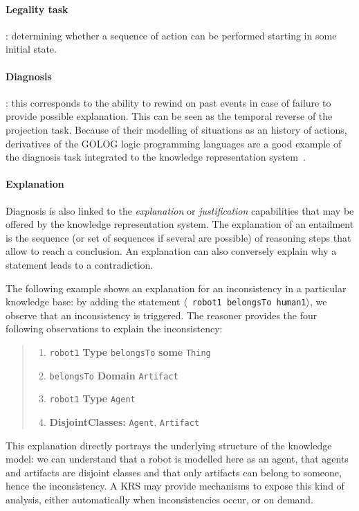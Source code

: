 \documentclass[a4paper, twocolumn]{article}
\newcommand{\concept}[1]{{\footnotesize \texttt{#1}}}
\newcommand{\stmt}[1]{{\footnotesize \tt $\langle$ #1\relax$\rangle$}}
\begin{document}
\paragraph{Legality task}: determining whether a sequence of action can be
performed starting in some initial state.

\paragraph{Diagnosis}: this corresponds to the ability to rewind on past events
in case of failure to provide possible explanation. This can be seen as the
temporal reverse of the projection task. Because of their modelling of
situations as an history of actions, derivatives of the GOLOG logic programming
languages are a good example of the diagnosis task integrated to the knowledge
representation system~\cite{Gspandl2011}.

\paragraph{Explanation} Diagnosis is also linked to the \emph{explanation} or
\emph{justification} capabilities that may be offered by the knowledge
representation system. The explanation of an entailment is the sequence (or set
of sequences if several are possible) of reasoning steps that allow to reach a
conclusion. An explanation can also conversely explain why a statement leads to
a contradiction.

The following example shows an explanation for an inconsistency in a particular
knowledge base: by adding the statement \stmt{robot1 belongsTo human1}, we
observe that an inconsistency is triggered. The reasoner provides the four
following observations to explain the inconsistency:

\begin{quote}
\scriptsize
\begin{enumerate}
    \item \concept{robot1} {\bf Type} \concept{belongsTo} {\bf some} \concept{Thing}
    \item \concept{belongsTo} {\bf Domain} \concept{Artifact}
    \item \concept{robot1} {\bf Type} \concept{Agent}
    \item {\bf DisjointClasses:} \concept{Agent}, \concept{Artifact}
\end{enumerate}
\normalsize
\end{quote}

This explanation directly portrays the underlying structure of the knowledge
model: we can understand that a robot is modelled here as an agent, that agents
and artifacts are disjoint classes and that only artifacts can belong to
someone, hence the inconsistency. A KRS may provide mechanisms to expose this
kind of analysis, either automatically when inconsistencies occur, or on
demand.
\end{document}
